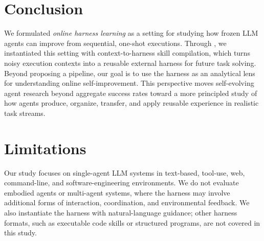 \section{Conclusion}\label{sec:con}

We formulated \emph{online harness learning} as a setting for studying how frozen LLM agents can improve from sequential, one-shot executions. Through \algname{}, we instantiated this setting with context-to-harness skill compilation, which turns noisy execution contexts into a reusable external harness for future task solving. Beyond proposing a pipeline, our goal is to use the harness as an analytical lens for understanding online self-improvement. This perspective moves self-evolving agent research beyond aggregate success rates toward a more principled study of how agents produce, organize, transfer, and apply reusable experience in realistic task streams.

\section*{Limitations}

Our study focuses on single-agent LLM systems in text-based, tool-use, web, command-line, and software-engineering environments. We do not evaluate embodied agents or multi-agent systems, where the harness may involve additional forms of interaction, coordination, and environmental feedback. We also instantiate the harness with natural-language guidance; other harness formats, such as executable code skills or structured programs, are not covered in this study.